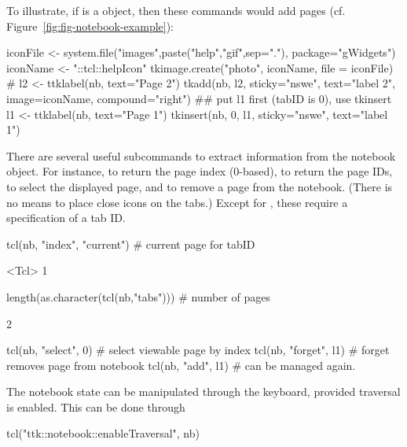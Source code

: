 To illustrate, if  is a  object, then these
commands would add pages (cf. Figure~\ref{fig:fig-notebook-example}):
\begin{Schunk}
\begin{Sinput}
 iconFile <- system.file("images",paste("help","gif",sep="."),
                         package="gWidgets")
 iconName <- "::tcl::helpIcon"
 tkimage.create("photo", iconName, file = iconFile)
 #
 l2 <- ttklabel(nb, text="Page 2")
 tkadd(nb, l2, sticky="nswe", text="label 2", 
     image=iconName, compound="right")
 ## put l1 first (tabID is 0), use tkinsert
 l1 <- ttklabel(nb, text="Page 1")
 tkinsert(nb, 0, l1, sticky="nswe", text="label 1")
\end{Sinput}
\end{Schunk}
%
There are several useful subcommands to extract information from the
notebook object.  For instance,  to return the page index
(0-based),  to return the page IDs,  to select
the displayed page, and  to remove a page from the
notebook. (There is no means to place close icons on the tabs.)
Except for , these require a specification of a tab ID.
\begin{Schunk}
\begin{Sinput}
 tcl(nb, "index", "current")           # current page for tabID
\end{Sinput}
\begin{Soutput}
<Tcl> 1 
\end{Soutput}
\begin{Sinput}
 length(as.character(tcl(nb,"tabs")))  # number of pages
\end{Sinput}
\begin{Soutput}
[1] 2
\end{Soutput}
\begin{Sinput}
 tcl(nb, "select", 0)                  # select viewable page by index
 tcl(nb, "forget", l1)                 # forget removes page from notebook
 tcl(nb, "add", l1)                    # can be managed again.
\end{Sinput}
\end{Schunk}
%

The notebook state can be manipulated through the keyboard, provided traversal is enabled. This can be done through
\begin{Schunk}
\begin{Sinput}
 tcl("ttk::notebook::enableTraversal", nb)
\end{Sinput}
\end{Schunk}

